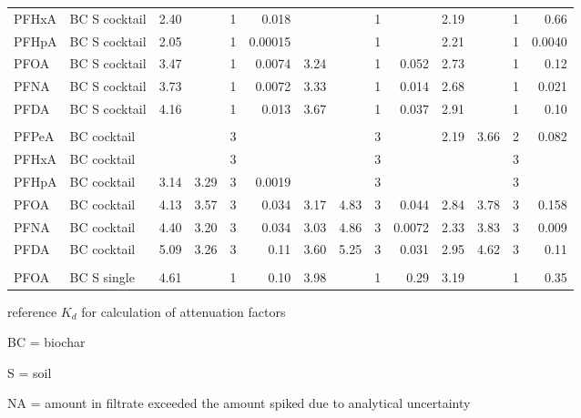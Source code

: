 \begin{table}[h]
{\begin{threeparttable}
\begin{tabular}{llrrrrrrrrrrrr}
PFHxA & BC S  cocktail & 2.40 &  & 1 & 0.018 &  &  & 1 &  & 2.19 &  & 1 & 0.66 \\
PFHpA & BC S  cocktail & 2.05 &  & 1 & 0.00015 &  &  & 1 &  & 2.21 &  & 1 & 0.0040 \\
PFOA & BC S  cocktail & 3.47 &  & 1 & 0.0074 & 3.24 &  & 1 & 0.052 & 2.73 &  & 1 & 0.12 \\
PFNA & BC S  cocktail & 3.73 &  & 1 & 0.0072 & 3.33 &  & 1 & 0.014 & 2.68 &  & 1 & 0.021 \\
PFDA & BC S  cocktail & 4.16 &  & 1 & 0.013 & 3.67 &  & 1 & 0.037 & 2.91 &  & 1 & 0.10 \\
 &  &  &  &  &  &  &  &  &  &  &  &  &  \\
PFPeA & BC  cocktail &  &  & 3 &  &  &  & 3 &  & 2.19 & 3.66 & 2 & 0.082 \\
PFHxA & BC  cocktail &  &  & 3 &  &  &  & 3 &  &  &  & 3 &  \\
PFHpA & BC  cocktail & 3.14 & 3.29 & 3 & 0.0019 &  &  & 3 &  &  &  & 3 &  \\
PFOA & BC  cocktail & 4.13 & 3.57 & 3 & 0.034 & 3.17 & 4.83 & 3 & 0.044 & 2.84 & 3.78 & 3 & 0.158 \\
PFNA & BC  cocktail & 4.40 & 3.20 & 3 & 0.034 & 3.03 & 4.86 & 3 & 0.0072 & 2.33 & 3.83 & 3 & 0.009 \\
PFDA & BC  cocktail & 5.09 & 3.26 & 3 & 0.11 & 3.60 & 5.25 & 3 & 0.031 & 2.95 & 4.62 & 3 & 0.11 \\
 &  &  &  &  &  &  &  &  &  &  &  &  &  \\
PFOA & BC S single & 4.61 &  & 1 & 0.10 & 3.98 &  & 1 & 0.29 & 3.19 &  & 1 & 0.35 \\ \bottomrule
\end{tabular}
\begin{tablenotes}
\item * reference $K_d$ for calculation of attenuation factors
\item BC = biochar
\item S = soil
\item NA = amount in filtrate exceeded the amount spiked due to analytical uncertainty
\end{tablenotes}
\end{threeparttable}}
\end{table}